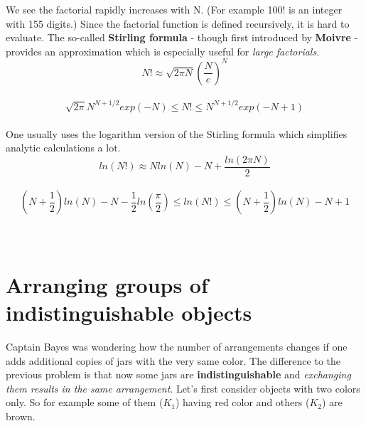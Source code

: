 \documentclass[12pt, a4paper]{scrartcl}
\begin{document}
We see the factorial rapidly increases with N. (For example 100! is an integer with 155 digits.) 
Since the factorial function is defined recursively, it is hard to evaluate. The so-called \textbf{Stirling formula} - though first introduced by \textbf{Moivre} - provides an approximation which is especially useful for \textit{large factorials}.
\begin{equation*}\boxed{N! \approx \sqrt{2\pi N}\left( \frac{N}{e}\right)^N
}\end{equation*}\\
\begin{equation*}\boxed{\sqrt{2\pi}N^{N+1/2}exp(-N)\leq N!\leq N^{N+1/2}exp(-N+1)
}\end{equation*}\\
One usually uses the logarithm version of the Stirling formula which simplifies analytic calculations a lot.\\

\begin{equation*}\boxed{ln(N!)\approx N ln(N)-N+\frac{ln(2\pi N)}{2}
}\end{equation*}\\
\begin{equation*}\boxed{\left(N+\frac 12 \right)ln(N)-N-\frac 12 ln\left(\frac{\pi}{2}\right)\leq ln(N!)\leq\left(N+\frac 12\right)ln(N) - N+1
}\end{equation*}\\
\\
\section*{Arranging groups of indistinguishable objects}
Captain  Bayes was wondering how the number of arrangements changes if one adds additional copies of jars with the very same color.
The difference to the previous problem is that now some jars are \textbf{indistinguishable} and \textit{exchanging them results in the same arrangement}.
Let’s first consider objects with two colors only. So for example some of them ($K_1$) having red color and others ($K_2$) are brown.
\end{document}
